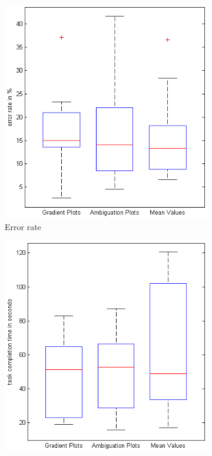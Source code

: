 \begin{figure}[H]
    \centering
    \begin{subfigure}[b]{0.32\textwidth}
        \includegraphics[width=\textwidth]{figures/boxplots/s4_error.png}
        \caption{Error rate}
        \label{fig:s4_error}
    \end{subfigure}
    \begin{subfigure}[b]{0.32\textwidth}
        \includegraphics[width=\textwidth]{figures/boxplots/s4_time.png}

\end{subfigure}
\end{figure}
